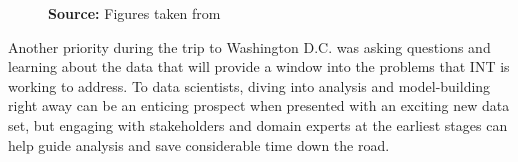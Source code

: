 \begin{figure}[H]
\begin{subfigure}[t]{0.5\textwidth}
\end{subfigure}
\footnotesize{\textbf{Source:} Figures taken from \cite{wb_poster}}
\end{figure}

Another priority during the trip to Washington D.C. was asking questions and learning about the data that will provide a window into the problems that INT is working to address. To data scientists, diving into analysis and model-building right away can be an enticing prospect when presented with an exciting new data set, but engaging with stakeholders and domain experts at the earliest stages can help guide analysis and save considerable time down the road.






